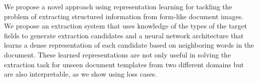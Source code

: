 We propose a novel approach using representation learning for tackling the problem of extracting structured information from form-like document images. We propose an extraction system that uses knowledge of the types of the target fields to generate extraction candidates and a neural network architecture that learns a dense representation of each candidate based on neighboring words in the document. These learned representations are not only useful in solving the extraction task for unseen document templates from two different domains but are also interpretable, as we show using loss cases.
